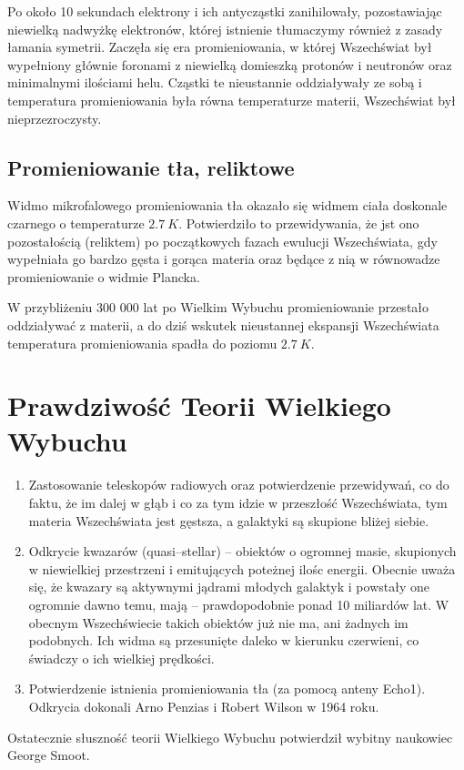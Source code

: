 \documentclass [a4paper, 11pt, oneside]{book}
\begin{document}
	Po około 10 sekundach elektrony i ich antycząstki zanihilowały, pozostawiając niewielką nadwyżkę elektronów, której istnienie tłumaczymy również z zasady łamania symetrii. Zaczęła się era promieniowania, w której Wszechświat był wypełniony głównie foronami z niewielką domieszką protonów i neutronów oraz minimalnymi ilościami helu. Cząstki te nieustannie oddziaływały ze sobą i temperatura promieniowania była równa temperaturze materii, Wszechświat był nieprzezroczysty.

	\subsection{Promieniowanie tła, reliktowe}
	Widmo mikrofalowego promieniowania tła okazało się widmem ciała doskonale czarnego o temperaturze $2.7~K$. Potwierdziło to przewidywania, że jst ono pozostałością (reliktem) po początkowych fazach ewulucji Wszechświata, gdy wypełniała go bardzo gęsta i gorąca materia oraz będące z nią w równowadze promieniowanie o widmie Plancka.

	W przybliżeniu 300 000 lat po Wielkim Wybuchu promieniowanie przestało oddziaływać z materii, a do dziś wskutek nieustannej ekspansji Wszechświata temperatura promieniowania spadła do poziomu $2.7~K$.

	\section{Prawdziwość Teorii Wielkiego Wybuchu}
	\begin{enumerate}
	\item Zastosowanie teleskopów radiowych oraz potwierdzenie przewidywań, co do faktu, że im dalej w głąb i co za tym idzie w przeszłość Wszechświata, tym materia Wszechświata jest gęstsza, a galaktyki są skupione bliżej siebie.
	\item Odkrycie kwazarów (quasi--stellar) -- obiektów o ogromnej masie, skupionych w niewielkiej przestrzeni i emitujących poteżnej ilośc energii. Obecnie uważa się, że kwazary są aktywnymi jądrami młodych galaktyk i powstały one ogromnie dawno temu, mają -- prawdopodobnie ponad 10 miliardów lat. W obecnym Wszechświecie takich obiektów już nie ma, ani żadnych im podobnych. Ich widma są przesunięte daleko w kierunku czerwieni, co świadczy o ich wielkiej prędkości.
	\item Potwierdzenie istnienia promieniowania tła (za pomocą anteny Echo1). Odkrycia dokonali Arno Penzias i Robert Wilson w 1964 roku.
	\end{enumerate}
	Ostatecznie słuszność teorii Wielkiego Wybuchu potwierdził wybitny naukowiec George Smoot.
\end{document}
